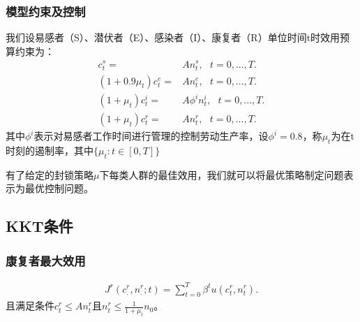 

\subsubsection{模型约束及控制}
我们设易感者（S）、潜伏者（E）、感染者（I）、康复者（R）单位时间t时效用预算约束为：
\begin{align}\label{con1}
    c_{t}^{s}=&A   n_{t}^{s}, \ \ \ t=0,...,T. \\
    (1+0.9 \mu_t) c_{t}^{e}=&A  n_{t}^{e}, \ \ \ t=0,...,T. \\
    (1+\mu_t) c_{t}^{i}=&A \phi^i n_{t}^{i}, \ \ \ t=0,...,T.  \\
    (1+\mu_t) c_{t}^{r}=&A n_{t}^{r}, \ \ \ t=0,...,T.
\end{align}
其中$\phi^i$表示对易感者工作时间进行管理的控制劳动生产率，设$\phi^i=0.8$，称$\mu_t$为在t时刻的遏制率，其中$\{\mu_t:t\in[0,T]\}$

有了给定的封锁策略$\mu$下每类人群的最佳效用，我们就可以将最优策略制定问题表示为最优控制问题。

\subsection{KKT条件}
\subsubsection{康复者最大效用}
\begin{align}
    J^r(c_.^r,n_.^r;t)=\sum_{t=0}^{T}\beta^t u(c_t^r,n_t^r).
\end{align}
且满足条件$c_t^r \leq  An_t^r$且$n_t^r \leq \frac{1}{1+\mu_t}n_0$。

